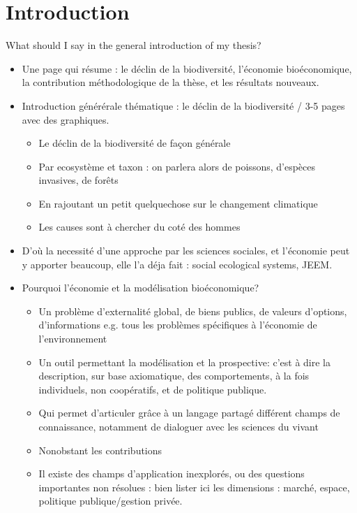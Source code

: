 \chapter*{Introduction}
\label{Introduction}

What should I say in the general introduction of my thesis? 

\begin{itemize}
\item Une page qui résume : le déclin de la biodiversité, l'économie bioéconomique, la contribution méthodologique de la thèse, et les résultats nouveaux. 

\item Introduction générérale thématique : le déclin de la biodiversité / 3-5 pages avec des graphiques. 
\begin{itemize}
\item Le déclin de la biodiversité de façon générale
\item Par ecosystème et taxon : on parlera alors de poissons, d'espèces invasives, de forêts
\item En rajoutant un petit quelquechose sur le changement climatique
\item Les causes sont à chercher du coté des hommes
\end{itemize}

\item D'où la necessité d'une approche par les sciences sociales, et l'économie peut y apporter beaucoup, elle l'a déja fait : social ecological systems, JEEM. 
\item Pourquoi l'économie et la modélisation bioéconomique?
\begin{itemize}
\item Un problème d'externalité global, de biens publics, de valeurs d'options, d'informations e.g. tous les problèmes spécifiques à l'économie de l'environnement
\item Un outil permettant la modélisation et la prospective: c'est à dire la description, sur base axiomatique, des comportements, à la fois individuels, non coopératifs, et de politique publique. 
\item Qui permet d'articuler grâce à un langage partagé différent champs de connaissance, notamment de dialoguer avec les sciences du vivant
\item Nonobstant les contributions
\item Il existe des champs d'application inexplorés, ou des questions importantes non résolues : bien lister ici les dimensions : marché, espace, politique publique/gestion privée. 
\end{itemize}


\end{itemize}
